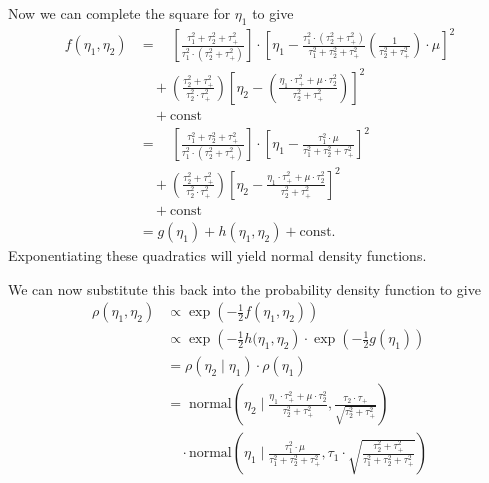 \documentclass[11pt, oneside]{article}
\begin{document}
Now we can complete the square for $\eta_{1}$ to give
%
\begin{align*}
f(\eta_{1}, \eta_{2})
&= \quad
\left[ \frac{ \tau_{1}^{2} + \tau_{2}^{2} + \tau_{+}^{2} }
{ \tau_{1}^{2} \cdot (\tau_{2}^{2} + \tau_{+}^{2}) }  \right] 
\cdot \left[ \eta_{1} -
\frac{ \tau_{1}^{2} \cdot (\tau_{2}^{2} + \tau_{+}^{2}) } 
{ \tau_{1}^{2} + \tau_{2}^{2} + \tau_{+}^{2} }
\left( \frac{ 1 }{ \tau_{2}^{2} + \tau_{+}^{2} } \right) \cdot \mu
\right]^{2} 
\\
&\quad +
\left( \frac{ \tau_{2}^{2} + \tau_{+}^{2} }{ \tau_{2}^{2} \cdot \tau_{+}^{2} } \right)
\left[ \eta_{2} -
\left( \frac{ \eta_{1} \cdot \tau_{+}^{2} + \mu \cdot \tau_{2}^{2} }{ \tau_{2}^{2} + \tau_{+}^{2} } \right) \right]^{2}
\\
&\quad +
\mathrm{const}
\\
&= \quad
\left[ \frac{ \tau_{1}^{2} + \tau_{2}^{2} + \tau_{+}^{2} }
{ \tau_{1}^{2} \cdot (\tau_{2}^{2} + \tau_{+}^{2}) }  \right] 
\cdot \left[ \eta_{1} -
\frac{ \tau_{1}^{2} \cdot \mu }{ \tau_{1}^{2} + \tau_{2}^{2} + \tau_{+}^{2} } \right]^{2} 
\\
&\quad +
\left( \frac{ \tau_{2}^{2} + \tau_{+}^{2} }{ \tau_{2}^{2} \cdot \tau_{+}^{2} } \right)
\left[ \eta_{2} -
\frac{ \eta_{1} \cdot \tau_{+}^{2} + \mu \cdot \tau_{2}^{2} }{ \tau_{2}^{2} + \tau_{+}^{2} } \right]^{2}
\\
&\quad +
\mathrm{const}
\\
&=
g(\eta_{1}) + h(\eta_{1}, \eta_{2}) + \mathrm{const}.
\end{align*}
%
Exponentiating these quadratics will yield normal density functions.

We can now substitute this back into the probability density function to give
%
\begin{align*}
\rho(\eta_{1}, \eta_{2})
&\propto
\exp \left( - \frac{1}{2} f(\eta_{1}, \eta_{2}) \right)
\\
&\propto
\exp \left( - \frac{1}{2} h(\eta_{1}, \eta_{2} \right)
\cdot \exp \left( - \frac{1}{2} g(\eta_{1}) \right)
\\
&=
\rho (\eta_{2} \mid \eta_{1}) \cdot \rho(\eta_{1})
\\
&= \;
\text{normal} \left( \eta_{2} \mid \frac{ \eta_{1} \cdot \tau_{+}^{2} + \mu \cdot \tau_{2}^{2} }{ \tau_{2}^{2} + \tau_{+}^{2} }, \frac{ \tau_{2} \cdot \tau_{+} }{ \sqrt{ \tau_{2}^{2} + \tau_{+}^{2} } } \right)
\\
&\quad \cdot
\text{normal} \left( \eta_{1} \mid \frac{ \tau_{1}^{2} \cdot \mu }{ \tau_{1}^{2} + \tau_{2}^{2} + \tau_{+}^{2} },
\tau_{1} \cdot \sqrt{ \frac{ \tau_{2}^{2} + \tau_{+}^{2} }{ \tau_{1}^{2} + \tau_{2}^{2} + \tau_{+}^{2} } } \right)
\end{align*}
\end{document}

